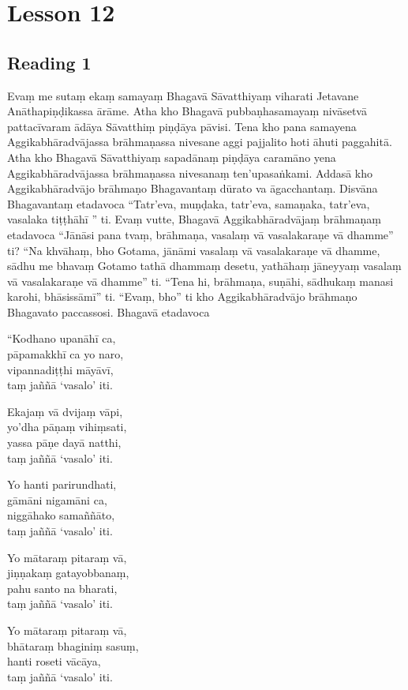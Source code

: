 \chapter{Lesson 12}

\section*{Reading 1}

Evaṃ me sutaṃ ekaṃ samayaṃ Bhagavā Sāvatthiyaṃ viharati Jetavane Anāthapiṇḍikassa ārāme. Atha kho Bhagavā pubbaṇhasamayaṃ nivāsetvā pattacīvaram ādāya Sāvatthiṃ piṇḍāya pāvisi. Tena kho pana samayena Aggikabhāradvājassa brāhmaṇassa nivesane aggi pajjalito hoti āhuti paggahitā. Atha kho Bhagavā Sāvatthiyaṃ sapadānaṃ piṇḍāya caramāno yena Aggikabhāradvājassa brāhmaṇassa nivesanaṃ ten’upasaṅkami. Addasā kho Aggikabhāradvājo brāhmaṇo Bhagavantaṃ dūrato va āgacchantaṃ. Disvāna Bhagavantaṃ etadavoca “Tatr’eva, muṇḍaka, tatr’eva, samaṇaka, tatr’eva, vasalaka tiṭṭhāhī ” ti. Evaṃ vutte, Bhagavā Aggikabhāradvājaṃ brāhmaṇaṃ etadavoca “Jānāsi pana tvaṃ, brāhmaṇa, vasalaṃ vā vasalakaraṇe vā dhamme” ti? “Na khvāhaṃ, bho Gotama, jānāmi vasalaṃ vā vasalakaraṇe vā dhamme, sādhu me bhavaṃ Gotamo tathā dhammaṃ desetu, yathāhaṃ jāneyyaṃ vasalaṃ vā vasalakaraṇe vā dhamme” ti. “Tena hi, brāhmaṇa, suṇāhi, sādhukaṃ manasi karohi, bhāsissāmī” ti. “Evaṃ, bho” ti kho Aggikabhāradvājo brāhmaṇo Bhagavato paccassosi. Bhagavā etadavoca

“Kodhano upanāhī ca,\\
pāpamakkhī ca yo naro,\\
vipannadiṭṭhi māyāvī,\\
taṃ jaññā ‘vasalo’ iti.

Ekajaṃ vā dvijaṃ vāpi,\\
yo’dha pāṇaṃ vihiṃsati,\\
yassa pāṇe dayā natthi,\\
taṃ jaññā ‘vasalo’ iti.

Yo hanti parirundhati,\\
gāmāni nigamāni ca,\\
niggāhako samaññāto,\\
taṃ jaññā ‘vasalo’ iti.

Yo mātaraṃ pitaraṃ vā,\\
jiṇṇakaṃ gatayobbanaṃ,\\
pahu santo na bharati,\\
taṃ jaññā ‘vasalo’ iti.

Yo mātaraṃ pitaraṃ vā,\\
bhātaraṃ bhaginiṃ sasuṃ,\\
hanti roseti vācāya,\\
taṃ jaññā ‘vasalo’ iti.

